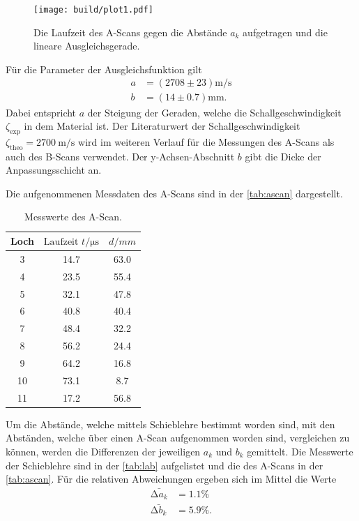 \begin{figure}[H]
	\texttt{[image: build/plot1.pdf]}
	\captionsetup{width=0.765\linewidth}
	\caption{Die Laufzeit des A-Scans gegen die Abstände $a_k$ aufgetragen und die lineare Ausgleichsgerade.}
	\label{fig:plot1}
\end{figure}

Für die Parameter der Ausgleichsfunktion gilt
\begin{align*}
    a &= \left(2708 \pm 23\right) \si{\meter \per \second}\\
    b &= \left(14 \pm 0.7\right) \si{\milli\meter}.
\end{align*}
Dabei entspricht $a$ der Steigung der Geraden, welche die Schallgeschwindigkeit $\zeta_{\text{exp}}$ in dem Material ist.
Der Literaturwert der Schallgeschwindigkeit $\zeta_{\text{theo}} = \SI{2700}{\meter\per\second}$ \cite{doppler} wird im weiteren Verlauf für die 
Messungen des A-Scans als auch des B-Scans verwendet.
Der y-Achsen-Abschnitt $b$ gibt die Dicke der Anpassungsschicht an. 

Die aufgenommenen Messdaten des A-Scans sind in der \autoref{tab:ascan} dargestellt.
\begin{table}[H]
    \centering
    \caption{Messwerte des A-Scan.}
    \label{tab:ascan}
\begin{tabular}{c c c}
    \toprule
    Loch & $\text{Laufzeit } t / \si{\micro\second} $ & $ d/ \si{mm}$\\
    \midrule
     3 & 14.7 & 63.0 \\
     4 & 23.5 & 55.4 \\
     5 & 32.1 & 47.8 \\
     6 & 40.8 & 40.4 \\
     7 & 48.4 & 32.2 \\
     8 & 56.2 & 24.4 \\
     9 & 64.2 & 16.8 \\
    10 & 73.1 &  8.7 \\
    11 & 17.2 & 56.8 \\
    \bottomrule
\end{tabular}
\end{table}

Um die Abstände, welche mittels Schieblehre bestimmt worden sind, mit den Abständen, welche über einen A-Scan aufgenommen worden sind,
vergleichen zu können, werden die Differenzen der jeweiligen $a_k$ und $b_k$ gemittelt.
Die Messwerte der Schieblehre sind in der \autoref{tab:lab} aufgelistet und die des A-Scans in der \autoref{tab:ascan}.
Für die relativen Abweichungen ergeben sich im Mittel die Werte
\begin{align*}
\bar{\increment a_k} &= 1.1\% \\
\bar{\increment b_k} &= 5.9\%.
\end{align*}

